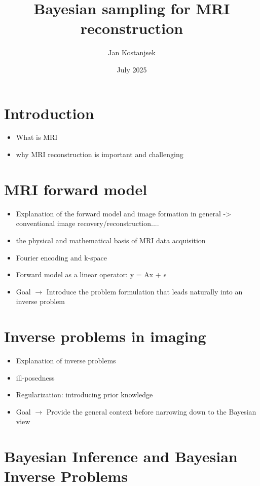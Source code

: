\documentclass{article}
\title{Bayesian sampling for MRI reconstruction}
\author{Jan Kostanjsek}
\date{July 2025}
\begin{document}
\maketitle

\section{Introduction}

\begin{itemize}
    \item What is MRI
    \item why MRI reconstruction is important and challenging
\end{itemize}

\section{MRI forward model}

\begin{itemize}
    \item  Explanation of the forward model and image formation in general -> conventional image recovery/reconstruction.... 
    \item the physical and mathematical basis of MRI data acquisition
    \item Fourier encoding and k-space
    \item Forward model as a linear operator: y = Ax + $\epsilon$
    \item Goal $\rightarrow$ Introduce the problem formulation that leads naturally into an inverse problem
\end{itemize}

\section{Inverse problems in imaging}

\begin{itemize}
    \item Explanation of inverse problems 
    \item ill-posedness
    \item Regularization: introducing prior knowledge
    \item Goal $\rightarrow$ Provide the general context before narrowing down to the Bayesian view
\end{itemize}

\section{Bayesian Inference and Bayesian Inverse Problems}
\end{document}
